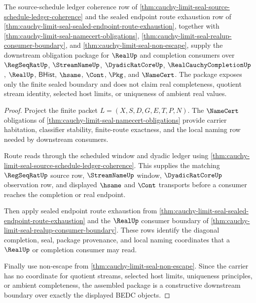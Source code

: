 \begin{theorem}
\label{thm:cauchy-limit-seal-namecert-downstream-unblock-package}
The source-schedule ledger coherence row of \autoref{thm:cauchy-limit-seal-source-schedule-ledger-coherence} and the sealed endpoint route exhaustion row of \autoref{thm:cauchy-limit-seal-sealed-endpoint-route-exhaustion}, together with \autoref{thm:cauchy-limit-seal-namecert-obligations}, \autoref{thm:cauchy-limit-seal-realup-consumer-boundary}, and \autoref{thm:cauchy-limit-seal-non-escape}, supply the downstream obligation package for $\RealUp$ and completion consumers over $\RegSeqRatUp$, $\StreamNameUp$, $\DyadicRatCoreUp$, $\RealCauchyCompletionUp$, $\RealUp$, $\mathsf{BHist}$, $\hsame$, $\Cont$, $\Pkg$, and $\NameCert$. The package exposes only the finite sealed boundary and does not claim real completeness, quotient stream identity, selected host limits, or uniqueness of ambient real values.
\end{theorem}
\begin{proof}
Project the finite packet $L=(X,S,D,G,E,T,P,N)$. The $\NameCert$ obligations of \autoref{thm:cauchy-limit-seal-namecert-obligations} provide carrier habitation, classifier stability, finite-route exactness, and the local naming row needed by downstream consumers.

Route reads through the scheduled window and dyadic ledger using \autoref{thm:cauchy-limit-seal-source-schedule-ledger-coherence}. This supplies the matching $\RegSeqRatUp$ source row, $\StreamNameUp$ window, $\DyadicRatCoreUp$ observation row, and displayed $\hsame$ and $\Cont$ transports before a consumer reaches the completion or real endpoint.

Then apply sealed endpoint route exhaustion from \autoref{thm:cauchy-limit-seal-sealed-endpoint-route-exhaustion} and the $\RealUp$ consumer boundary of \autoref{thm:cauchy-limit-seal-realup-consumer-boundary}. These rows identify the diagonal completion, seal, package provenance, and local naming coordinates that a $\RealUp$ or completion consumer may read.

Finally use non-escape from \autoref{thm:cauchy-limit-seal-non-escape}. Since the carrier has no coordinate for quotient streams, selected host limits, uniqueness principles, or ambient completeness, the assembled package is a constructive downstream boundary over exactly the displayed BEDC objects.
\end{proof}

